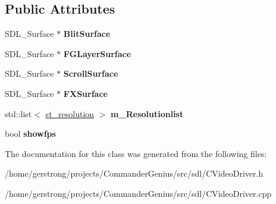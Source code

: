 \subsection*{Public Attributes}
\begin{DoxyCompactItemize}
\item 
\hypertarget{class_c_video_driver_a6639f0222ea7e3e6fcfa9e301e354de8}{
SDL\_\-Surface $\ast$ {\bfseries BlitSurface}}
\label{class_c_video_driver_a6639f0222ea7e3e6fcfa9e301e354de8}

\item 
\hypertarget{class_c_video_driver_ade32fa2d4d0bd4d693325af54c53bbb2}{
SDL\_\-Surface $\ast$ {\bfseries FGLayerSurface}}
\label{class_c_video_driver_ade32fa2d4d0bd4d693325af54c53bbb2}

\item 
\hypertarget{class_c_video_driver_a24b144f36644e88e2bb2cac0da5f9e71}{
SDL\_\-Surface $\ast$ {\bfseries ScrollSurface}}
\label{class_c_video_driver_a24b144f36644e88e2bb2cac0da5f9e71}

\item 
\hypertarget{class_c_video_driver_aca5f8145ea65160b3ec3d6ed7ae54898}{
SDL\_\-Surface $\ast$ {\bfseries FXSurface}}
\label{class_c_video_driver_aca5f8145ea65160b3ec3d6ed7ae54898}

\item 
\hypertarget{class_c_video_driver_a8177a2c9d835dca14f6597a9689d032f}{
std::list$<$ \hyperlink{structst__resolution}{st\_\-resolution} $>$ {\bfseries m\_\-Resolutionlist}}
\label{class_c_video_driver_a8177a2c9d835dca14f6597a9689d032f}

\item 
\hypertarget{class_c_video_driver_a51e2be14cae5e32f5ef497d04b7ab78a}{
bool {\bfseries showfps}}
\label{class_c_video_driver_a51e2be14cae5e32f5ef497d04b7ab78a}

\end{DoxyCompactItemize}


The documentation for this class was generated from the following files:\begin{DoxyCompactItemize}
\item 
/home/gerstrong/projects/CommanderGenius/src/sdl/CVideoDriver.h\item 
/home/gerstrong/projects/CommanderGenius/src/sdl/CVideoDriver.cpp\end{DoxyCompactItemize}
